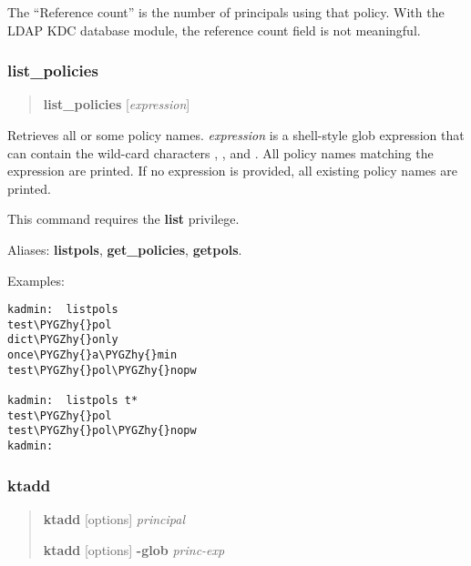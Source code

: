 \documentclass[letterpaper,10pt,english]{sphinxmanual}
\def\PYGZhy{\char`\-}
\begin{document}
The ``Reference count'' is the number of principals using that policy.
With the LDAP KDC database module, the reference count field is not
meaningful.
\label{admin/admin_commands/kadmin_local:get-policy-end}

\subsubsection{list\_policies}
\label{admin/admin_commands/kadmin_local:get-policy-end}\label{admin/admin_commands/kadmin_local:list-policies}\label{admin/admin_commands/kadmin_local:id16}\begin{quote}

\textbf{list\_policies} {[}\emph{expression}{]}
\end{quote}

Retrieves all or some policy names.  \emph{expression} is a shell-style
glob expression that can contain the wild-card characters ,
\code{*}, and \code{{[}{]}}.  All policy names matching the expression are
printed.  If no expression is provided, all existing policy names are
printed.

This command requires the \textbf{list} privilege.

Aliases: \textbf{listpols}, \textbf{get\_policies}, \textbf{getpols}.

Examples:

\begin{Verbatim}[commandchars=\\\{\}]
kadmin:  listpols
test\PYGZhy{}pol
dict\PYGZhy{}only
once\PYGZhy{}a\PYGZhy{}min
test\PYGZhy{}pol\PYGZhy{}nopw

kadmin:  listpols t*
test\PYGZhy{}pol
test\PYGZhy{}pol\PYGZhy{}nopw
kadmin:
\end{Verbatim}
\label{admin/admin_commands/kadmin_local:list-policies-end}

\subsubsection{ktadd}
\label{admin/admin_commands/kadmin_local:ktadd}\label{admin/admin_commands/kadmin_local:list-policies-end}\label{admin/admin_commands/kadmin_local:id17}\begin{quote}

\begin{DUlineblock}{0em}
\item[] \textbf{ktadd} {[}options{]} \emph{principal}
\item[] \textbf{ktadd} {[}options{]} \textbf{-glob} \emph{princ-exp}
\end{DUlineblock}
\end{quote}
\end{document}
